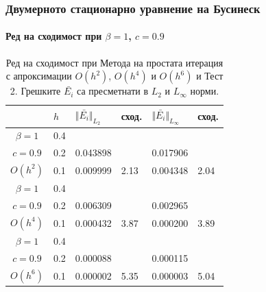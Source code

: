 \documentclass{beamer}
\begin{document}
\begin{frame}
\frametitle{Двумерното стационарно уравнение на Бусинеск}
\framesubtitle{Ред на сходимост при $\beta = 1$, $c=0.9$}

\begin{table}[ht]
\centering
		\begin{tabular}{||c|l|ll|ll||}
			\hline
			\hline
             & $h$  &  	$\Vert \bar{ E_i} \Vert_{L_2}$ 	& сход.	& $\Vert \bar{ E_i}\Vert_{L_\infty}$  		&сход.   \\
   					\hline 					
			\hline 	
$\beta = 1$   	&0.4   &             &           &                & \\
     $c=0.9$     &0.2   &  0.043898  &             & 0.017906      &    \\
     $O(h^2)$	&0.1  & 0.009999 & 2.13       & 0.004348      & 2.04  \\
\hline 	
 $\beta = 1$   	&0.4  &            &               &               &     \\
     $c=0.9$  	&0.2   & 0.006309  &              & 0.002965      &        \\
     $O(h^4)$	&0.1  &  0.000432 &3.87        & 0.000200 &  3.89        \\
    \hline
 $\beta = 1$	&0.4   &             &        &               &        \\
   $ c=0.9$  	&0.2   &  0.000088  &        & 0.000115      &       \\
       $O(h^6)$	&0.1  &   0.000002 &5.35  & 0.000003 &   5.04       \\
	   \hline
			\hline 
		\end{tabular}
		\caption{Ред на сходимост при Метода на простата итерация с апроксимации $O(h^{2})$, $O(h^{4})$ и $O(h^{6})$ и Тест 2. Грешките $\bar{ E_i}$ са пресметнати в $L_2$ и $L_\infty$ норми.}
\label{tab:aB}
\end{table}

\end{frame}
\end{document}
